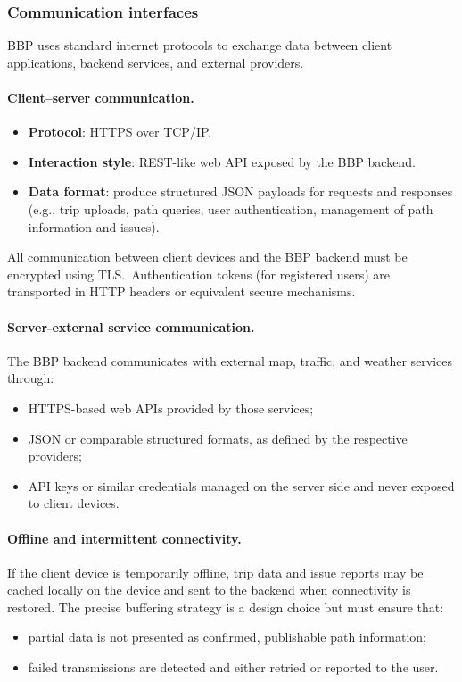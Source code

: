 \subsubsection{Communication interfaces}
BBP uses standard internet protocols to exchange data between client applications, backend services, and external providers.
\paragraph{Client–server communication.}
\begin{itemize}[noitemsep,topsep=0.4em]
  \item \textbf{Protocol}: HTTPS over TCP/IP.\
  \item \textbf{Interaction style}: REST-like web API exposed by the BBP backend.
  \item \textbf{Data format}: produce structured JSON payloads for requests and responses (e.g., trip uploads, path queries, user authentication, management of path information and issues).
\end{itemize}
All communication between client devices and the BBP backend must be encrypted using TLS.\ Authentication tokens (for registered users) are transported in HTTP headers or equivalent secure mechanisms.

\paragraph{Server-external service communication.}
The BBP backend communicates with external map, traffic, and weather services through:
\begin{itemize}[noitemsep,topsep=0.4em]
  \item HTTPS-based web APIs provided by those services;
  \item JSON or comparable structured formats, as defined by the respective providers;
  \item API keys or similar credentials managed on the server side and never exposed to client devices.
\end{itemize}

\paragraph{Offline and intermittent connectivity.}
If the client device is temporarily offline, trip data and issue reports may be cached locally on the device and sent to the backend when connectivity is restored. The precise buffering strategy is a design choice but must ensure that:
\begin{itemize}[noitemsep,topsep=0.4em]
  \item partial data is not presented as confirmed, publishable path information;
  \item failed transmissions are detected and either retried or reported to the user.
\end{itemize}



